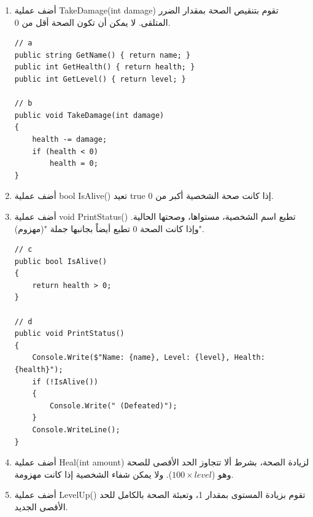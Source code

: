 \documentclass[14pt]{extarticle}
\begin{document}
\begin{enumerate}[itemsep=2em]
\begin{enumerate} [itemsep=1em]
    \item
    أضف عملية \textenglish{TakeDamage(int damage)} تقوم بتنقيص الصحة بمقدار الضرر المتلقى. لا يمكن أن تكون الصحة أقل من 0.

    \ifwithsols
    \begin{boxSolution}
    \begin{english}
    \begin{verbatim}
// a
public string GetName() { return name; }
public int GetHealth() { return health; }
public int GetLevel() { return level; }

// b
public void TakeDamage(int damage)
{
    health -= damage;
    if (health < 0)
        health = 0;
}
    \end{verbatim}
    \end{english}
    \end{boxSolution}
    \clearpage
    \fi

    \item
    أضف عملية \textenglish{bool IsAlive()} تعيد \textenglish{true} إذا كانت صحة الشخصية أكبر من 0.

    \item أضف عملية \textenglish{void PrintStatus()} تطبع اسم الشخصية، مستواها، وصحتها الحالية. وإذا كانت الصحة 0 تطبع أيضاً بجانبها جملة "(مهزوم)".

    \ifwithsols
    \begin{boxSolution}
    \begin{english}
    \begin{verbatim}
// c
public bool IsAlive()
{
    return health > 0;
}

// d
public void PrintStatus()
{
    Console.Write($"Name: {name}, Level: {level}, Health: {health}");
    if (!IsAlive())
    {
        Console.Write(" (Defeated)");
    }
    Console.WriteLine();
}
    \end{verbatim}
    \end{english}
    \end{boxSolution}
    \clearpage
    \fi

    \item
    أضف عملية \textenglish{Heal(int amount)} لزيادة الصحة، بشرط ألا تتجاوز الحد الأقصى للصحة وهو ($100 \times level$). ولا يمكن شفاء الشخصية إذا كانت مهزومة.

    \item
    أضف عملية \textenglish{LevelUp()} تقوم بزيادة المستوى بمقدار 1، وتعبئة الصحة بالكامل للحد الأقصى الجديد.


\end{enumerate}
\end{enumerate}
\end{document}
